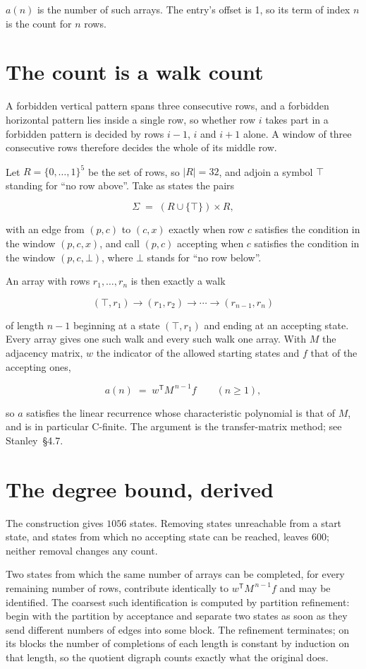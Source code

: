 \documentclass[11pt]{article}
\theoremstyle{definition}
\begin{document}
$a(n)$ is the number of such arrays. The entry's offset is 1, so its term of index $n$ is the count for $n$ rows.

\section{The count is a walk count}

A forbidden vertical pattern spans three consecutive rows, and a forbidden horizontal pattern lies inside a single row, so whether row $i$ takes part in a forbidden pattern is decided by rows $i-1$, $i$ and $i+1$ alone. A window of three consecutive rows therefore decides the whole of its middle row.

Let $R = \{0,\dots,1\}^{5}$ be the set of rows, so $|R| = 32$, and adjoin a symbol $\top$ standing for ``no row above''. Take as states the pairs

\[\Sigma \;=\; (R \cup \{\top\}) \times R,\]

with an edge from $(p,c)$ to $(c,x)$ exactly when row $c$ satisfies the condition in the window $(p,c,x)$, and call $(p,c)$ accepting when $c$ satisfies the condition in the window $(p,c,\bot)$, where $\bot$ stands for ``no row below''.

An array with rows $r_1,\dots,r_n$ is then exactly a walk

\[(\top,r_1) \to (r_1,r_2) \to \cdots \to (r_{n-1},r_n)\]

of length $n-1$ beginning at a state $(\top,r_1)$ and ending at an accepting state. Every array gives one such walk and every such walk one array. With $M$ the adjacency matrix, $w$ the indicator of the allowed starting states and $f$ that of the accepting ones,

\[a(n) \;=\; w^{\mathsf T} M^{\,n-1} f \qquad (n \ge 1),\]

so $a$ satisfies the linear recurrence whose characteristic polynomial is that of $M$, and is in particular C-finite. The argument is the transfer-matrix method; see Stanley~\S4.7.

\section{The degree bound, derived}

The construction gives $1056$ states. Removing states unreachable from a start state, and states from which no accepting state can be reached, leaves $600$; neither removal changes any count.

Two states from which the same number of arrays can be completed, for every remaining number of rows, contribute identically to $w^{\mathsf T}M^{\,n-1}f$ and may be identified. The coarsest such identification is computed by partition refinement: begin with the partition by acceptance and separate two states as soon as they send different numbers of edges into some block. The refinement terminates; on its blocks the number of completions of each length is constant by induction on that length, so the quotient digraph counts exactly what the original does.
\end{document}
